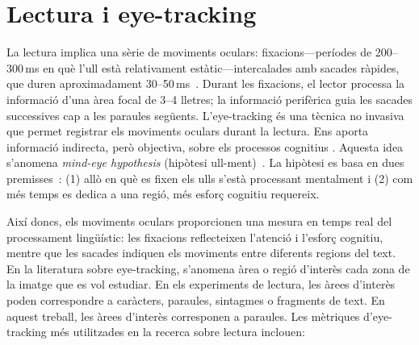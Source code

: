 \section{Lectura i eye-tracking}

La lectura implica una sèrie de moviments oculars: fixacions---períodes de 200--300\,ms en què l'ull està relativament estàtic---intercalades amb sacades ràpides, que duren aproximadament 30--50\,ms~\cite{rayner1998eye}.
Durant les fixacions, el lector processa la informació d'una àrea focal de 3--4 lletres; la informació perifèrica guia les sacades successives cap a les paraules següents.
L'eye-tracking és una tècnica no invasiva que permet registrar els moviments oculars durant la lectura.
Ens aporta informació indirecta, però objectiva, sobre els processos cognitius \cite{conklinEyeTrackingGuideApplied2018}.
Aquesta idea s'anomena \textit{mind-eye hypothesis} (hipòtesi ull-ment)~\cite{just1980theory}.
La hipòtesi es basa en dues premisses~\cite{pickering2004eye}: (1) allò en què es fixen els ulls s'està processant mentalment i (2) com més temps es dedica a una regió, més esforç cognitiu requereix.

Així doncs, els moviments oculars proporcionen una mesura en temps real del processament lingüístic: les fixacions reflecteixen l'atenció i l'esforç cognitiu, mentre que les sacades indiquen els moviments entre diferents regions del text.
En la literatura sobre eye-tracking, s'anomena àrea o regió d'interès cada zona de la imatge que es vol estudiar.
En els experiments de lectura, les àrees d'interès poden correspondre a caràcters, paraules, sintagmes o fragments de text.
En aquest treball, les àrees d'interès corresponen a paraules.
Les mètriques d'eye-tracking més utilitzades en la recerca sobre lectura inclouen:

